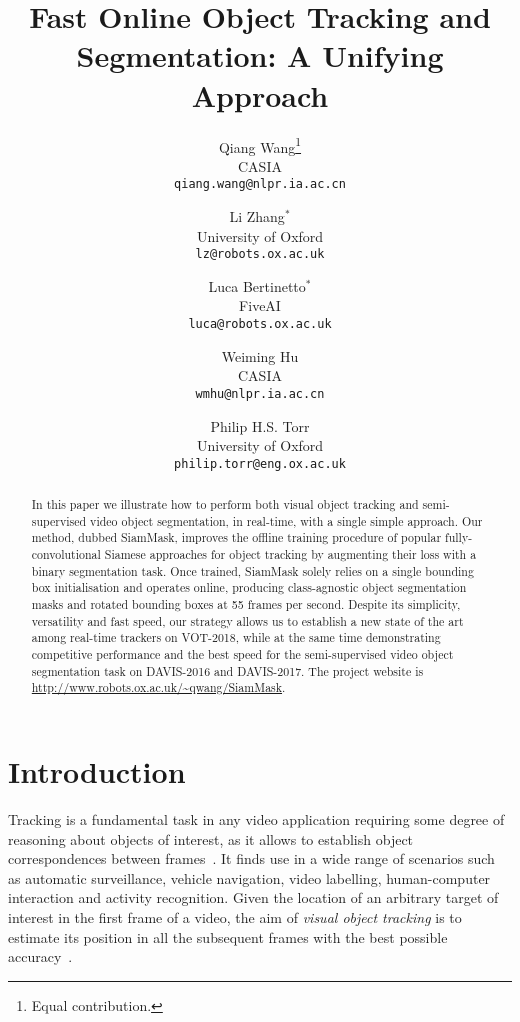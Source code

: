 \documentclass[10pt,twocolumn,letterpaper]{article}
\begin{document}
\title{Fast Online Object Tracking and Segmentation: A Unifying Approach}

\author{Qiang Wang\thanks{Equal contribution.}\\
CASIA\\
{\tt\small qiang.wang@nlpr.ia.ac.cn}
\and
Li Zhang$^*$\\
University of Oxford\\
{\tt\small lz@robots.ox.ac.uk}
\and
Luca Bertinetto$^*$\\
FiveAI\\
{\tt\small luca@robots.ox.ac.uk}
\and
Weiming Hu\\
CASIA\\
{\tt\small wmhu@nlpr.ia.ac.cn}
\and
Philip H.S. Torr\\
University of Oxford\\
{\tt\small philip.torr@eng.ox.ac.uk}
}

\maketitle
\begin{abstract}
\noindent 
In this paper we illustrate how to perform both visual object tracking and semi-supervised video object segmentation, in real-time, with a single simple approach.
Our method, dubbed SiamMask, improves the offline training procedure of popular fully-convolutional Siamese approaches for object tracking by augmenting their loss with a binary segmentation task.
Once trained, SiamMask solely relies on a single bounding box initialisation and operates online, producing class-agnostic object segmentation masks and rotated bounding boxes at 55 frames per second.
Despite its simplicity, versatility and fast speed, our strategy allows us to establish a new state of the art among real-time trackers on VOT-2018, while at the same time demonstrating competitive performance and the best speed for the semi-supervised video object segmentation task on DAVIS-2016 and DAVIS-2017. 
The project website is \url{http://www.robots.ox.ac.uk/~qwang/SiamMask}.
\end{abstract}
 
\section{Introduction}
Tracking is a fundamental task in any video application requiring some degree of reasoning about objects of interest, as it allows to establish object correspondences between frames~\cite{makovski2008visual}. 
It finds use in a wide range of scenarios such as automatic surveillance, vehicle navigation, video labelling, human-computer interaction and activity recognition.
Given the location of an arbitrary target of interest in the first frame of a video, the aim of \emph{visual object tracking} is to estimate its position in all the subsequent frames with the best possible accuracy~\cite{smeulders2014visual}.
\end{document}
